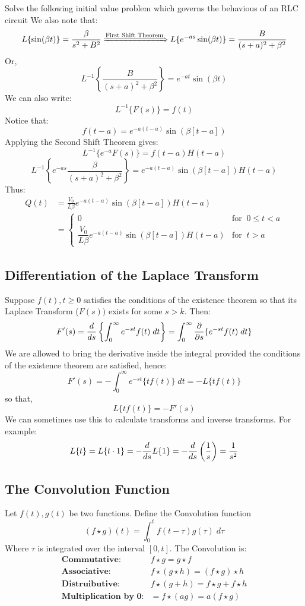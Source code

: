 \documentclass[a4paper, 10pt]{article}
\begin{document}
\begin{examplebox}{Solve the following initial value problem which governs the behavious of an RLC circuit}{}
  We also note that:
  $$L\{\sin(\beta t)\} = \frac{\beta}{s^2 + B^2} \xRightarrow{\text{First Shift Theorem}} L\{e^{-as} \sin(\beta t)\} = \frac{B}{(s+a)^2 + \beta^2}$$
  Or,
  $$L^{-1} \left\{\frac{B}{(s+a)^2 + \beta^2}\right\} = e^{-at}\sin(\beta t)$$
  We can also write:
  $$L^{-1}\{F(s)\} = f(t)$$
  Notice that:
  $$f(t-a) = e^{-a(t-a)} \sin(\beta [t-a])$$
  Applying the Second Shift Theorem gives:
  $$L^{-1}\{e^{-a} F(s)\} = f(t-a)H(t-a)$$
  $$L^{-1} \left\{e^{-as}\frac{\beta}{(s+a)^2 + \beta^2}\right\} = e^{-a(t-a)}\sin(\beta[t-a])H(t-a)$$
  Thus:
  \begin{align*}
    Q(t) & = \frac{V_0}{L\beta} e^{-a(t-a)}\sin(\beta[t-a])H(t-a)                                \\
         & = \begin{cases}
               0                                                     & \text{for}\;\; 0 \leq t < a \\
               \dfrac{V_0}{L\beta} e^{-a(t-a)}\sin(\beta[t-a])H(t-a) & \text{for}\;\; t > a
             \end{cases}
  \end{align*}
  \normalsize
\end{examplebox}
\pagebreak
\subsection{Differentiation of the Laplace Transform}
Suppose $f(t), t \geq 0$ satisfies the conditions of the existence theorem so
that its Laplace Transform ($F(s))$ exists for some $s > k$. Then:
$$F'(s) = \frac{d}{ds} \left\{ \int_0^\infty e^{-st}f(t)\; dt \right\} = \int_0^\infty \frac{\partial}{\partial s}\{e^{-st}f(t) \; dt\}$$
We are allowed to bring the derivative inside the integral provided the conditions of the existence theorem are satisfied, hence:
$$F'(s) = -\int_0^\infty e^{-st}\{tf(t)\}\; dt = -L\{tf(t)\}$$
so that,
$$L\{tf(t)\} = -F'(s)$$
We can sometimes use this to calculate transforms and inverse transforms. For example:
$$L\{t\} = L\{t \cdot 1\} = - \frac{d}{ds}L\{1\} = -\frac{d}{ds}\left(\frac{1}{s}\right) = \frac{1}{s^2}$$

\subsection{The Convolution Function}
Let $f(t), g(t)$ be two functions. Define the Convolution function
$$(f \star g)(t) = \int_0^t f(t-\tau)g(\tau) \; d\tau$$
Where $\tau$ is integrated over the interval $[0,t]$.  The Convolution is:
\begin{align*}
  \textbf{Commutative:}         & f \star g = g \star f                     \\
  \textbf{Associative:}         & f \star (g \star h) = (f \star g) \star h \\
  \textbf{Distruibutive:}       & f \star (g + h) = f \star g + f \star h   \\
  \textbf{Multiplication by 0:} & = f \star (ag) = a(f \star g)
\end{align*}
\end{document}

